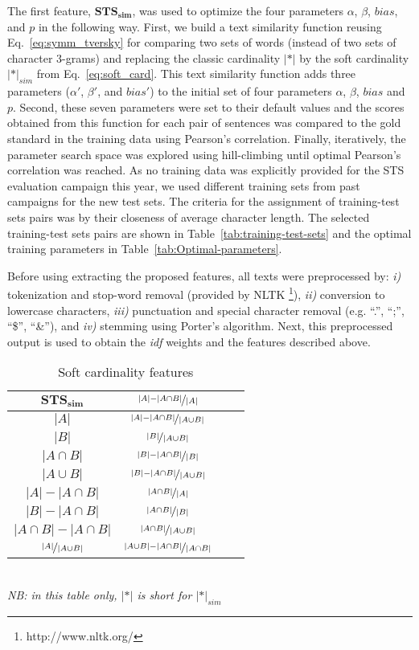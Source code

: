The first feature, $\mathbf{STS_{sim}}$, was used to optimize the four
parameters $\alpha$, $\beta$, $bias$, and $p$ in the following way.
First, we build a text similarity function reusing Eq.~\ref{eq:symm_tversky}
for comparing two sets of words (instead of two sets of character
3-grams) and replacing the classic cardinality $|*|$ by the soft
cardinality $|*|_{sim}$ from Eq.~\ref{eq:soft_card}. This text similarity
function adds three parameters ($\alpha'$, $\beta'$, and $bias'$) to
the initial set of four parameters $\alpha$, $\beta$, $bias$ and $p$.
Second, these seven parameters were set to their default values and the
scores obtained from this function for each pair of sentences was compared
to the gold standard in the training data using Pearson's correlation.
Finally, iteratively, the parameter search space was explored using
hill-climbing until optimal Pearson's correlation was reached. As no
training data was explicitly provided for the STS evaluation campaign
this year, we used different training sets from past campaigns for
the new test sets. The criteria for the assignment of training-test
sets pairs was by their closeness of average character length.
The selected training-test sets pairs are shown in Table~\ref{tab:training-test-sets}
and the optimal training parameters in Table~\ref{tab:Optimal-parameters}.

Before using extracting the proposed features, all texts were preprocessed
by: \emph{i)} tokenization and stop-word removal (provided by NLTK%
\footnote{http://www.nltk.org/%
}), \emph{ii)} conversion to lowercase characters, \emph{iii)} punctuation
and special character removal (e.g. ``.'', ``;'', ``\$'', ``\&''),
and \emph{iv) }stemming using Porter's algorithm. Next, this preprocessed
output is used to obtain the \emph{idf} weights and the features described
above.

\begin{table}[t!]
\begin{centering}
\begin{tabular}{|c|c|c|c|}
\hline 
$\mathbf{STS_{sim}}$  & $\nicefrac{|A|-|A\cap B|}{|A|}$\tabularnewline
\hline 
{\small $|A|$} &  $\nicefrac{|A|-|A\cap B|}{|A\cup B|}$\tabularnewline
\hline 
{\small $|B|$} &  $\nicefrac{|B|}{|A\cup B|}$\tabularnewline
\hline 
{\small $|A\cap B|$} & $\nicefrac{|B|-|A\cap B|}{|B|}$\tabularnewline
\hline 
{\small $|A\cup B|$} &  $\nicefrac{|B|-|A\cap B|}{|A\cup B|}$\tabularnewline
\hline 
{\small $|A|-|A\cap B|$} & $\nicefrac{|A\cap B|}{|A|}$\tabularnewline
\hline 
{\small $|B|-|A\cap B|$}  & $\nicefrac{|A\cap B|}{|B|}$\tabularnewline
\hline 
{\small $|A\cap B|-|A\cap B|$} & $\nicefrac{|A\cap B|}{|A\cup B|}$\tabularnewline
\hline 
$\nicefrac{|A|}{|A\cup B|}$ & $\nicefrac{|A\cup B|-|A\cap B|}{|A\cap B|}$\tabularnewline
\hline
\end{tabular}
\\[1ex]
{\hfill\em\footnotesize NB: in this table only, $|*|$ is short for $|*|_{sim}$\hfill}
\end{centering}
\caption{Soft cardinality features\label{tab:features}}
\end{table}


